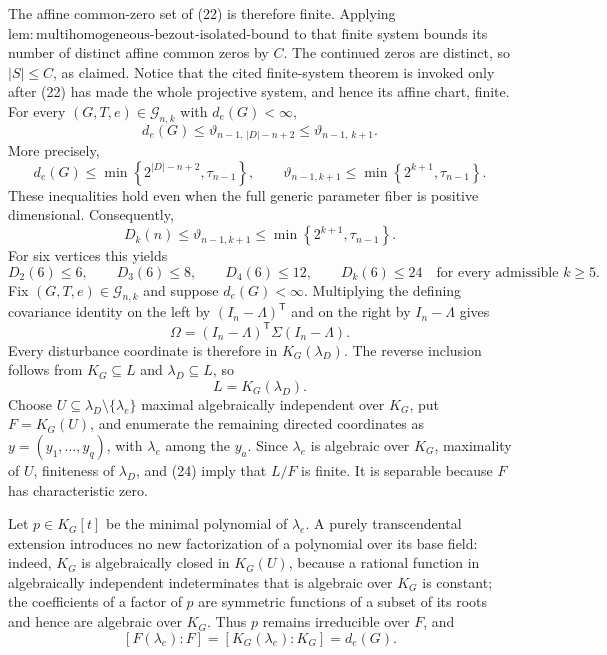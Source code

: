 The affine common-zero set of (22) is therefore finite. Applying \(\mathrm{lem:multihomogeneous\mbox{-}bezout\mbox{-}isolated\mbox{-}bound}\) to that finite system bounds its number of distinct affine common zeros by \(C\). The continued zeros are distinct, so \(|S|\leq C\), as claimed. Notice that the cited finite-system theorem is invoked only after (22) has made the whole projective system, and hence its affine chart, finite.
For every \((G,T,e)\in\mathcal G_{n,k}\) with \(d_e(G)<\infty\),
\[
 d_e(G)
 \leq \vartheta_{n-1,\,|D|-n+2}
 \leq \vartheta_{n-1,\,k+1}.
\]
More precisely,
\[
 d_e(G)\leq\min\!\left\{2^{|D|-n+2},\tau_{n-1}\right\},
 \qquad
 \vartheta_{n-1,k+1}\leq\min\!\left\{2^{k+1},\tau_{n-1}\right\}.
\]
These inequalities hold even when the full generic parameter fiber is positive dimensional. Consequently,
\[
 D_k(n)\leq\vartheta_{n-1,k+1}\leq\min\!\left\{2^{k+1},\tau_{n-1}\right\}.
\]
For six vertices this yields
\[
 D_2(6)\leq6,\qquad D_3(6)\leq8,\qquad D_4(6)\leq12,
 \qquad D_k(6)\leq24\quad\text{for every admissible }k\geq5.
\]
Fix \((G,T,e)\in\mathcal G_{n,k}\) and suppose \(d_e(G)<\infty\). Multiplying the defining covariance identity on the left by \((I_n-\Lambda)^{\mathsf T}\) and on the right by \(I_n-\Lambda\) gives
\[
 \Omega=(I_n-\Lambda)^{\mathsf T}\Sigma(I_n-\Lambda).
\tag{23}
\]
Every disturbance coordinate is therefore in \(K_G(\lambda_D)\). The reverse inclusion follows from \(K_G\subseteq L\) and \(\lambda_D\subseteq L\), so
\[
 L=K_G(\lambda_D).
\tag{24}
\]
Choose \(U\subseteq\lambda_D\setminus\{\lambda_e\}\) maximal algebraically independent over \(K_G\), put \(F=K_G(U)\), and enumerate the remaining directed coordinates as \(y=(y_1,\ldots,y_q)\), with \(\lambda_e\) among the \(y_a\). Since \(\lambda_e\) is algebraic over \(K_G\), maximality of \(U\), finiteness of \(\lambda_D\), and (24) imply that \(L/F\) is finite. It is separable because \(F\) has characteristic zero.

Let \(p\in K_G[t]\) be the minimal polynomial of \(\lambda_e\). A purely transcendental extension introduces no new factorization of a polynomial over its base field: indeed, \(K_G\) is algebraically closed in \(K_G(U)\), because a rational function in algebraically independent indeterminates that is algebraic over \(K_G\) is constant; the coefficients of a factor of \(p\) are symmetric functions of a subset of its roots and hence are algebraic over \(K_G\). Thus \(p\) remains irreducible over \(F\), and
\[
 [F(\lambda_e):F]
 =[K_G(\lambda_e):K_G]
 =d_e(G).
\tag{25}
\]

